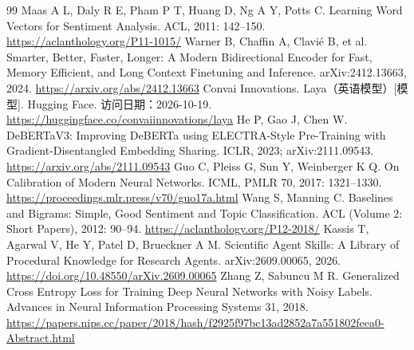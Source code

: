 \documentclass[UTF8,fontset=fandol,a4paper,11pt]{ctexart}
\begin{document}
\FloatBarrier\begin{thebibliography}{99}
 Maas A L, Daly R E, Pham P T, Huang D, Ng A Y, Potts C. Learning Word Vectors for Sentiment Analysis. ACL, 2011: 142–150. \url{https://aclanthology.org/P11-1015/}
 Warner B, Chaffin A, Clavié B, et al. Smarter, Better, Faster, Longer: A Modern Bidirectional Encoder for Fast, Memory Efficient, and Long Context Finetuning and Inference. arXiv:2412.13663, 2024. \url{https://arxiv.org/abs/2412.13663}
 Convai Innovations. Laya（英语模型）[模型]. Hugging Face. 访问日期：2026-10-19. \url{https://huggingface.co/convaiinnovations/laya}
 He P, Gao J, Chen W. DeBERTaV3: Improving DeBERTa using ELECTRA-Style Pre-Training with Gradient-Disentangled Embedding Sharing. ICLR, 2023; arXiv:2111.09543. \url{https://arxiv.org/abs/2111.09543}
 Guo C, Pleiss G, Sun Y, Weinberger K Q. On Calibration of Modern Neural Networks. ICML, PMLR 70, 2017: 1321–1330. \url{https://proceedings.mlr.press/v70/guo17a.html}
 Wang S, Manning C. Baselines and Bigrams: Simple, Good Sentiment and Topic Classification. ACL (Volume 2: Short Papers), 2012: 90–94. \url{https://aclanthology.org/P12-2018/}
 Kassis T, Agarwal V, He Y, Patel D, Brueckner A M. Scientific Agent Skills: A Library of Procedural Knowledge for Research Agents. arXiv:2609.00065, 2026. \url{https://doi.org/10.48550/arXiv.2609.00065}
 Zhang Z, Sabuncu M R. Generalized Cross Entropy Loss for Training Deep Neural Networks with Noisy Labels. Advances in Neural Information Processing Systems 31, 2018. \url{https://papers.nips.cc/paper/2018/hash/f2925f97bc13ad2852a7a551802feea0-Abstract.html}
\end{thebibliography}
\end{document}
